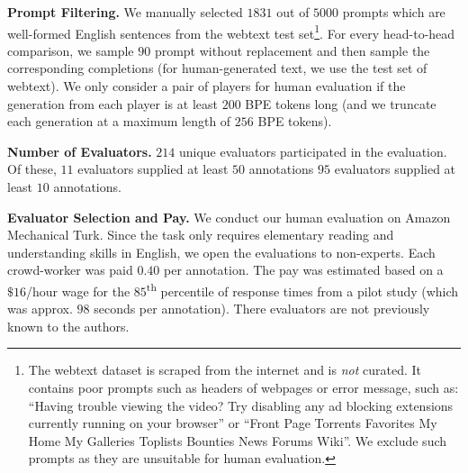 \documentclass{article}
\newcommand{\myparagraph}[1]{\par\noindent\textbf{{#1}.}} %
\theoremstyle{definition}
\begin{document}
\myparagraph{Prompt Filtering}
We manually selected $1831$ out of $5000$ prompts which are well-formed English sentences from the webtext test set\footnote{
The webtext dataset is scraped from the internet 
and is {\em not} curated. It contains poor prompts
such as headers of webpages or error message, such as:
``Having trouble viewing the video? Try disabling any ad blocking extensions currently running on your browser''
or ``Front Page Torrents Favorites My Home My Galleries Toplists Bounties News Forums Wiki''.
We exclude such prompts as they are unsuitable for human evaluation.
}.
For every head-to-head comparison, we sample $90$
prompt without replacement and then sample the corresponding 
completions (for human-generated text, we use the test set of webtext). We only consider a pair of players for human evaluation if the generation from each player is 
at least $200$ BPE tokens long (and we truncate each generation
at a maximum length of $256$ BPE tokens). 


\myparagraph{Number of Evaluators}
 $214$ unique evaluators 
participated in the evaluation. 
Of these, 
$11$ evaluators supplied at least $50$ annotations
$95$ evaluators supplied at least $10$
annotations.

\myparagraph{Evaluator Selection and Pay}
We conduct our human evaluation on Amazon Mechanical Turk. Since the task only requires elementary reading and understanding skills in English, we open 
the evaluations to non-experts. Each crowd-worker was paid 
$0.40$ per annotation. The pay was estimated based on a 
$\$16$/hour wage for the $85$\textsuperscript{th} percentile
of response times from a pilot study (which was approx. $98$ seconds per annotation). There evaluators are not previously known to the authors.
\end{document}
